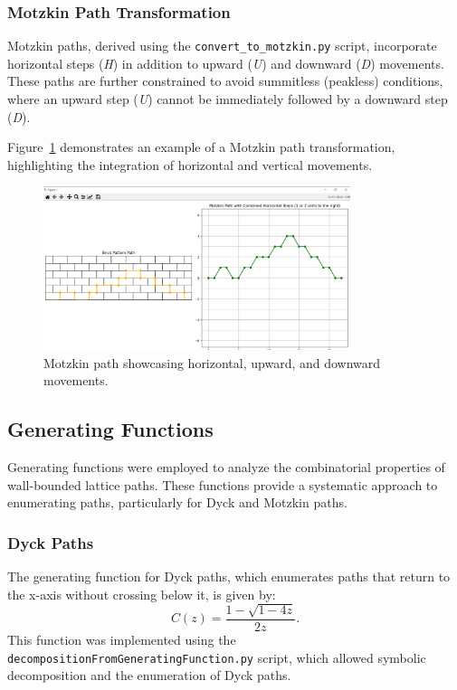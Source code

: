 \documentclass{article}
\begin{document}
\subsubsection{Motzkin Path Transformation}
Motzkin paths, derived using the \texttt{convert\_to\_motzkin.py} script, incorporate horizontal steps (\textit{H}) in addition to upward (\textit{U}) and downward (\textit{D}) movements. These paths are further constrained to avoid summitless (peakless) conditions, where an upward step (\textit{U}) cannot be immediately followed by a downward step (\textit{D}).

Figure~\ref{fig:motzkin_path} demonstrates an example of a Motzkin path transformation, highlighting the integration of horizontal and vertical movements.

\begin{figure}[h]
    \centering
    \includegraphics[width=0.8\textwidth]{images/motzkin.jpg}
    \caption{Motzkin path showcasing horizontal, upward, and downward movements.}
    \label{fig:motzkin_path}
\end{figure}


\subsection{Generating Functions}

Generating functions were employed to analyze the combinatorial properties of wall-bounded lattice paths. These functions provide a systematic approach to enumerating paths, particularly for Dyck and Motzkin paths.

\subsubsection{Dyck Paths}
The generating function for Dyck paths, which enumerates paths that return to the x-axis without crossing below it, is given by:
\[
C(z) = \frac{1 - \sqrt{1 - 4z}}{2z}.
\]
This function was implemented using the \texttt{decompositionFromGeneratingFunction.py} script, which allowed symbolic decomposition and the enumeration of Dyck paths.
\end{document}
